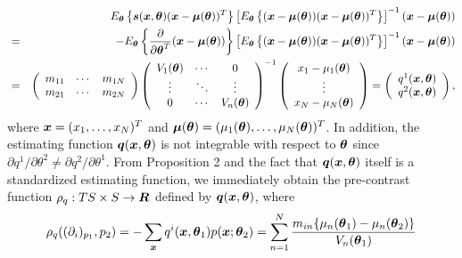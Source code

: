 \documentclass[graybox]{svmult}
\newcommand{\bm}[1]{\mbox{\boldmath $#1$}}
\newcommand{\bms}[1]{\mbox{\scriptsize\boldmath $#1$}}
\begin{document}
\begin{eqnarray*}
   &&E_{\bms{\theta}}\left\{\bm{s}(\bm{x},\bm{\theta})(\bm{x} - \bm{\mu}(\bm{\theta}))^T\right\}
     \left[E_{\bms{\theta}}\left\{(\bm{x} - \bm{\mu}(\bm{\theta}))(\bm{x} - \bm{\mu}(\bm{\theta}))^T\right\}\right]^{-1}
     (\bm{x} - \bm{\mu}(\bm{\theta})) \\
   &=&
      -E_{\bms{\theta}}\left\{\frac{\partial}{\partial\bm{\theta}^T}(\bm{x} - \bm{\mu}(\bm{\theta}))\right\}
      \left[E_{\bms{\theta}}\left\{(\bm{x} - \bm{\mu}(\bm{\theta}))(\bm{x} - \bm{\mu}(\bm{\theta}))^T\right\}\right]^{-1}
      (\bm{x} - \bm{\mu}(\bm{\theta})) \\
   &=&
      \left(\begin{array}{ccc}
               m_{11} & \cdots & m_{1N} \\
               m_{21} & \cdots & m_{2N}
            \end{array}
      \right)
      \left(\begin{array}{ccc}
               V_1(\bm{\theta}) & \cdots & 0 \\
               \vdots               & \ddots & \vdots \\
               0                       & \cdots & V_n(\bm{\theta})
            \end{array}
      \right)^{-1}
      \left(\begin{array}{c}
               x_1 - \mu_1(\bm{\theta}) \\
               \vdots \\
               x_N - \mu_N(\bm{\theta})
            \end{array}
      \right)
    = \left(\begin{array}{c}
               q^1(\bm{x},\bm{\theta}) \\
               q^2(\bm{x},\bm{\theta})
            \end{array}
      \right),
\end{eqnarray*}
%
where $\bm{x}=(x_1,\ldots,x_N)^T$ and $\bm{\mu}(\bm{\theta})=(\mu_1(\bm{\theta}),\ldots,\mu_N(\bm{\theta}))^T$.
In addition, the estimating function $\bm{q}(\bm{x},\bm{\theta})$ is not integrable with respect
to $\bm{\theta}$ since $\partial q^1/\partial\theta^2 \neq \partial q^2/\partial\theta^1$.
From Proposition 2 and the fact that $\bm{q}(\bm{x},\bm{\theta})$ itself is a standardized estimating function,
we immediately obtain the pre-contrast function $\rho_q:TS \times S \rightarrow \bm{R}$
defined by $\bm{q}(\bm{x},\bm{\theta})$, where
%
\begin{eqnarray*}
   \rho_q((\partial_i)_{p_1},p_2) = -\sum_{\bms{x}}q^i(\bm{x},\bm{\theta}_1)p(\bm{x};\bm{\theta}_2)
                                  = \sum_{n=1}^{N}\frac{m_{in}\{\mu_n(\bm{\theta}_1) - \mu_n(\bm{\theta}_2)\}}
                                    {V_n(\bm{\theta}_1)}
\end{eqnarray*}
\end{document}

